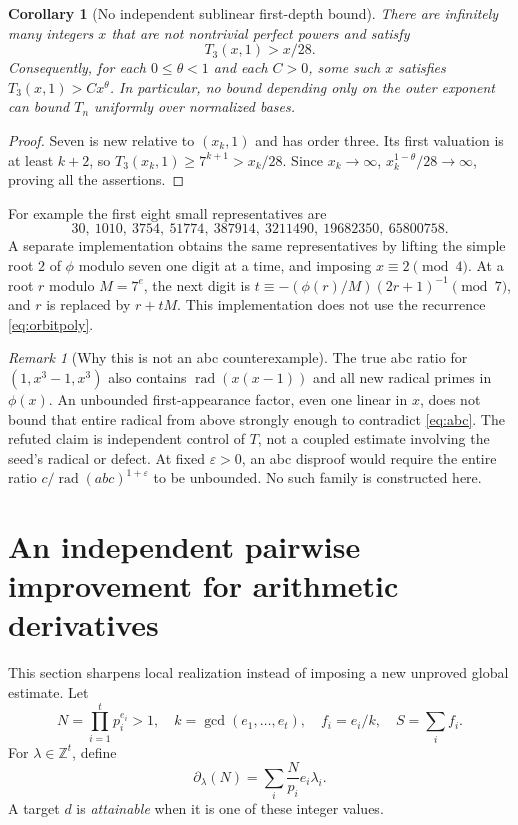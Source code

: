 \documentclass[11pt]{article}
\newtheorem{corollary}[theorem]{Corollary}
\theoremstyle{definition}\newtheorem{definition}[theorem]{Definition}
\theoremstyle{remark}\newtheorem{remark}[theorem]{Remark}
\DeclareMathOperator{\rad}{rad}\DeclareMathOperator{\ord}{ord}\DeclareMathOperator{\lcm}{lcm}
\newcommand{\Z}{\mathbb Z}\newcommand{\N}{\mathbb N}\newcommand{\R}{\mathbb R}
\begin{document}
\begin{corollary}[No independent sublinear first-depth bound]\label{cor:linear}
There are infinitely many integers $x$ that are not nontrivial perfect
powers and satisfy
\begin{equation}\label{eq:lineart}
T_3(x,1)>x/28.
\end{equation}
Consequently, for each $0\le\theta<1$ and each $C>0$, some such $x$ satisfies
$T_3(x,1)>Cx^\theta$. In particular, no bound depending only on the outer
exponent can bound $T_n$ uniformly over normalized bases.
\end{corollary}
\begin{proof}
Seven is new relative to $(x_k,1)$ and has order three. Its first valuation
is at least $k+2$, so $T_3(x_k,1)\ge7^{k+1}>x_k/28$. Since $x_k\to\infty$,
$x_k^{1-\theta}/28\to\infty$, proving all the assertions.
\end{proof}

For example the first eight small representatives are
\[
30,\ 1010,\ 3754,\ 51774,\ 387914,\ 3211490,\ 19682350,\ 65800758.
\]
A separate implementation obtains the same representatives by lifting the
simple root $2$ of $\phi$ modulo seven one digit at a time, and imposing
$x\equiv2\pmod4$. At a root $r$ modulo $M=7^e$, the next digit is
$t\equiv-(\phi(r)/M)(2r+1)^{-1}\pmod7$, and $r$ is replaced by $r+tM$.
This implementation does not use the recurrence \eqref{eq:orbitpoly}.

\begin{remark}[Why this is not an abc counterexample]
The true abc ratio for $(1,x^3-1,x^3)$ also contains
$\rad(x(x-1))$ and all new radical primes in $\phi(x)$. An unbounded
first-appearance factor, even one linear in $x$, does not bound that entire
radical from above strongly enough to contradict \eqref{eq:abc}.
The refuted claim is independent control of $T$, not a coupled estimate
involving the seed's radical or defect. At fixed $\varepsilon>0$, an abc
disproof would require the entire ratio $c/\rad(abc)^{1+\varepsilon}$ to be
unbounded. No such family is constructed here.
\end{remark}

\section{An independent pairwise improvement for arithmetic derivatives}
This section sharpens local realization instead of imposing a new
unproved global estimate. Let
\[
N=\prod_{i=1}^t p_i^{e_i}>1,\quad
k=\gcd(e_1,\ldots,e_t),\quad f_i=e_i/k,\quad S=\sum_i f_i.
\]
For $\lambda\in\Z^t$, define
\[
\partial_\lambda(N)=\sum_i \frac{N}{p_i}e_i\lambda_i.
\]
A target $d$ is \emph{attainable} when it is one of these integer values.
\end{document}
